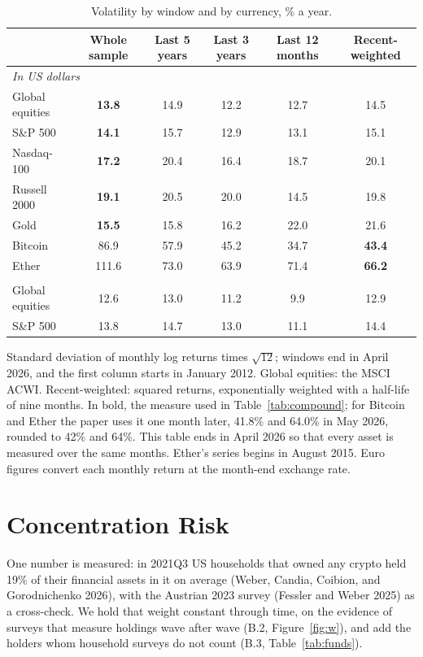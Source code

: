 \documentclass[11pt]{article}
\begin{document}
\begin{table}[!htbp]\centering\small
\caption{Volatility by window and by currency, \% a year.}
\label{tab:volwin}
\begin{tabular}{lccccc}
\toprule
 & Whole sample & Last 5 years & Last 3 years & Last 12 months & Recent-weighted \\
\midrule
\multicolumn{6}{l}{\emph{In US dollars}} \\
Global equities & \textbf{13.8} & 14.9 & 12.2 & 12.7 & 14.5 \\
S\&P 500 & \textbf{14.1} & 15.7 & 12.9 & 13.1 & 15.1 \\
Nasdaq-100 & \textbf{17.2} & 20.4 & 16.4 & 18.7 & 20.1 \\
Russell 2000 & \textbf{19.1} & 20.5 & 20.0 & 14.5 & 19.8 \\
Gold & \textbf{15.5} & 15.8 & 16.2 & 22.0 & 21.6 \\
Bitcoin & 86.9 & 57.9 & 45.2 & 34.7 & \textbf{43.4} \\
Ether & 111.6 & 73.0 & 63.9 & 71.4 & \textbf{66.2} \\
\addlinespace
\multicolumn{6}{l}{\emph{In euros}} \\
Global equities & 12.6 & 13.0 & 11.2 & 9.9 & 12.9 \\
S\&P 500 & 13.8 & 14.7 & 13.0 & 11.1 & 14.4 \\
\bottomrule
\end{tabular}
\par\smallskip\parbox{0.92\textwidth}{\footnotesize Standard deviation of monthly log returns times $\sqrt{12}$; windows end in April 2026, and the first column starts in January 2012. Global equities: the MSCI ACWI. Recent-weighted: squared returns, exponentially weighted with a half-life of nine months. In bold, the measure used in Table~\ref{tab:compound}; for Bitcoin and Ether the paper uses it one month later, 41.8\% and 64.0\% in May 2026, rounded to 42\% and 64\%. This table ends in April 2026 so that every asset is measured over the same months. Ether's series begins in August 2015. Euro figures convert each monthly return at the month-end exchange rate.}
\end{table}

\section{Concentration Risk}

One number is measured: in 2021Q3 US households that owned any crypto held 19\% of their financial assets in it on average (Weber, Candia, Coibion, and Gorodnichenko 2026), with the Austrian 2023 survey (Fessler and Weber 2025) as a cross-check. We hold that weight constant through time, on the evidence of surveys that measure holdings wave after wave (B.2, Figure~\ref{fig:w}), and add the holders whom household surveys do not count (B.3, Table~\ref{tab:funds}).
\end{document}
